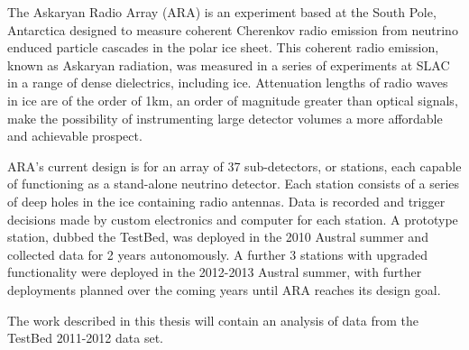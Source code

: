 The Askaryan Radio Array (ARA) is an experiment based at the South Pole, Antarctica designed to measure coherent Cherenkov radio emission from neutrino enduced particle cascades in the polar ice sheet. This coherent radio emission, known as Askaryan radiation, was measured in a series of experiments at SLAC in a range of dense dielectrics, including ice. Attenuation lengths of radio waves in ice are of the order of 1km, an order of magnitude greater than optical signals, make the possibility of instrumenting large detector volumes a more affordable and achievable prospect.

ARA's current design is for an array of 37 sub-detectors, or stations, each capable of functioning as a stand-alone neutrino detector. Each station consists of a series of deep holes in the ice containing radio antennas. Data is recorded and trigger decisions made by custom electronics and computer for each station. A prototype station, dubbed the TestBed, was deployed in the 2010 Austral summer and collected data for 2 years autonomously. A further 3 stations with upgraded functionality were deployed in the 2012-2013 Austral summer, with further deployments planned over the coming years until ARA reaches its design goal.

The work described in this thesis will contain an analysis of data from the TestBed 2011-2012 data set. 




